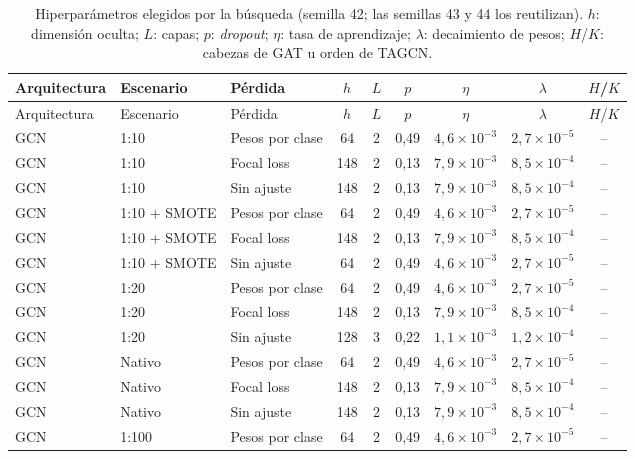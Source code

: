 \begin{longtable}{lllcccccc}
\caption{Hiperparámetros elegidos por la búsqueda (semilla 42; las semillas 43 y 44 los reutilizan). $h$: dimensión oculta; $L$: capas; $p$: \textit{dropout}; $\eta$: tasa de aprendizaje; $\lambda$: decaimiento de pesos; $H$/$K$: cabezas de GAT u orden de TAGCN.}\label{tab:hiper}\\
\toprule
Arquitectura & Escenario & Pérdida & $h$ & $L$ & $p$ & $\eta$ & $\lambda$ & $H$/$K$ \\
\midrule
\endfirsthead
\toprule
Arquitectura & Escenario & Pérdida & $h$ & $L$ & $p$ & $\eta$ & $\lambda$ & $H$/$K$ \\
\midrule
\endhead
GCN & 1:10 & Pesos por clase & 64 & 2 & 0{,}49 & $4{,}6 \times 10^{-3}$ & $2{,}7 \times 10^{-5}$ & -- \\
GCN & 1:10 & Focal loss & 148 & 2 & 0{,}13 & $7{,}9 \times 10^{-3}$ & $8{,}5 \times 10^{-4}$ & -- \\
GCN & 1:10 & Sin ajuste & 148 & 2 & 0{,}13 & $7{,}9 \times 10^{-3}$ & $8{,}5 \times 10^{-4}$ & -- \\
GCN & 1:10 + SMOTE & Pesos por clase & 64 & 2 & 0{,}49 & $4{,}6 \times 10^{-3}$ & $2{,}7 \times 10^{-5}$ & -- \\
GCN & 1:10 + SMOTE & Focal loss & 148 & 2 & 0{,}13 & $7{,}9 \times 10^{-3}$ & $8{,}5 \times 10^{-4}$ & -- \\
GCN & 1:10 + SMOTE & Sin ajuste & 64 & 2 & 0{,}49 & $4{,}6 \times 10^{-3}$ & $2{,}7 \times 10^{-5}$ & -- \\
GCN & 1:20 & Pesos por clase & 64 & 2 & 0{,}49 & $4{,}6 \times 10^{-3}$ & $2{,}7 \times 10^{-5}$ & -- \\
GCN & 1:20 & Focal loss & 148 & 2 & 0{,}13 & $7{,}9 \times 10^{-3}$ & $8{,}5 \times 10^{-4}$ & -- \\
GCN & 1:20 & Sin ajuste & 128 & 3 & 0{,}22 & $1{,}1 \times 10^{-3}$ & $1{,}2 \times 10^{-4}$ & -- \\
GCN & Nativo & Pesos por clase & 64 & 2 & 0{,}49 & $4{,}6 \times 10^{-3}$ & $2{,}7 \times 10^{-5}$ & -- \\
GCN & Nativo & Focal loss & 148 & 2 & 0{,}13 & $7{,}9 \times 10^{-3}$ & $8{,}5 \times 10^{-4}$ & -- \\
GCN & Nativo & Sin ajuste & 148 & 2 & 0{,}13 & $7{,}9 \times 10^{-3}$ & $8{,}5 \times 10^{-4}$ & -- \\
GCN & 1:100 & Pesos por clase & 64 & 2 & 0{,}49 & $4{,}6 \times 10^{-3}$ & $2{,}7 \times 10^{-5}$ & -- \\

\end{longtable}
